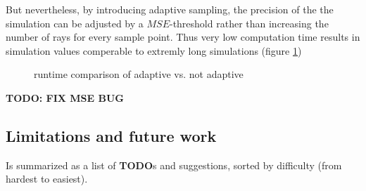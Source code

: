 But nevertheless, by introducing adaptive sampling, the precision of the the simulation
can be adjusted by a $MSE$-threshold rather than increasing the number
of rays for every sample point. Thus very low computation time results in
simulation values comperable to extremly long simulations (figure \ref{plot:adaptive_runtime})\\
\begin{figure}[H]
  \centerline{
    }
  \caption{runtime comparison of adaptive vs. not adaptive }
  \label{plot:adaptive_runtime}
\end{figure}

\textbf{TODO: FIX MSE BUG}


\subsection{Limitations and future work}
\label{subsec:limitations}

Is summarized as a list of \textbf{TODO}s and suggestions, sorted by difficulty (from
hardest to easiest).

